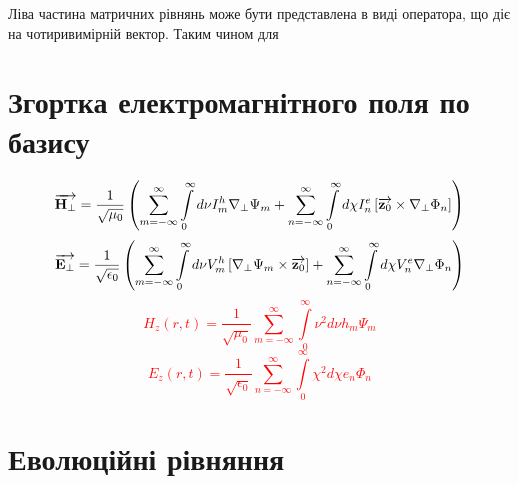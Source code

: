 Ліва частина матричних рівнянь може бути представлена в виді оператора, 
що діє на чотиривимірній вектор. Таким чином для  


\section{Згортка електромагнітного поля по базису}

\textcolor{red} { \begin{equation}
\overrightarrow{\mathbf H_\perp} = \frac{1}{\sqrt{\mu_0}} \left( 
\sum \limits_{m=-\infty}^{\infty} \int \limits_{0}^{\infty} d \nu
I_m^h \nabla_\perp \Psi_m + \sum \limits_{n=-\infty}^{\infty}
\int \limits_{0}^{\infty} d \chi I_n^e 
\left[ \overrightarrow{\mathbf z_0} \times \nabla_\perp \Phi_n \right] \right)
\end{equation} }
%
\textcolor{red} { \begin{equation} 
\overrightarrow{\mathbf E_\perp} = \frac{1}{\sqrt{\epsilon_0}} \left( 
\sum \limits_{m=-\infty}^{\infty} \int \limits_{0}^{\infty} 
d \nu V_m^h \left[  \nabla_\perp \Psi_m  \times  \overrightarrow{\mathbf z_0}  \right] +
\sum \limits_{n=-\infty}^{\infty} \int \limits_{0}^{\infty}
d \chi V_n^e \nabla_\perp \Phi_n \right)
\end{equation} }
%
\textcolor{red} { \begin{equation} 
H_z (r,t) = \frac{1}{\sqrt{\mu_0}} \sum \limits_{m=-\infty}^{\infty}
\int \limits_0^\infty \nu^2 d \nu h_m \Psi_m
\end{equation} }
%
\textcolor{red} { \begin{equation} 
E_z (r,t) = \frac{1}{\sqrt{\epsilon_0}} \sum \limits_{n=-\infty}^{\infty}
\int \limits_0^\infty \chi^2 d \chi e_n \Phi_n
\end{equation} }

\section{Еволюційні рівняння}

